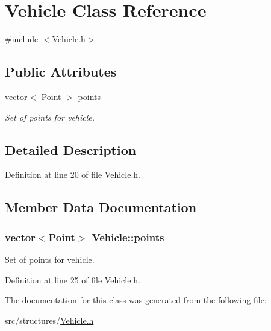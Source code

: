 \hypertarget{class_vehicle}{
\section{\-Vehicle \-Class \-Reference}
\label{class_vehicle}
}


{\ttfamily \#include $<$\-Vehicle.\-h$>$}

\subsection*{\-Public \-Attributes}
\begin{DoxyCompactItemize}
\item 
vector$<$ \-Point $>$ \hyperlink{class_vehicle_a2af9db56dd7456796efa2524243f8d94}{points}
\begin{DoxyCompactList}\small\item\em \-Set of points for vehicle. \end{DoxyCompactList}\end{DoxyCompactItemize}


\subsection{\-Detailed \-Description}


\-Definition at line 20 of file \-Vehicle.\-h.



\subsection{\-Member \-Data \-Documentation}
\hypertarget{class_vehicle_a2af9db56dd7456796efa2524243f8d94}{
\subsubsection[{points}]{\setlength{\rightskip}{0pt plus 5cm}vector$<$\-Point$>$ {\bf \-Vehicle\-::points}}}
\label{class_vehicle_a2af9db56dd7456796efa2524243f8d94}


\-Set of points for vehicle. 



\-Definition at line 25 of file \-Vehicle.\-h.



\-The documentation for this class was generated from the following file\-:\begin{DoxyCompactItemize}
\item 
src/structures/\hyperlink{_vehicle_8h}{\-Vehicle.\-h}\end{DoxyCompactItemize}
